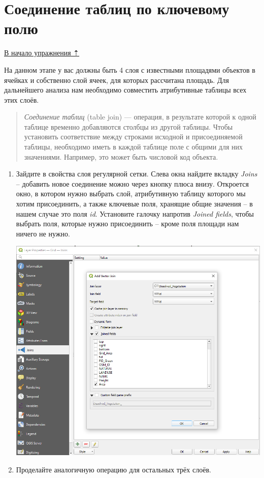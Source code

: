 \documentclass[
  12pt,
]{book}
\begin{document}
\hypertarget{spatrelations-join}{%
\section{Соединение таблиц по ключевому полю}\label{spatrelations-join}}

\protect\hyperlink{spatrelations}{В начало упражнения ⇡}

На данном этапе у вас должны быть 4 слоя с известными площадями объектов в ячейках и собственно слой ячеек, для которых рассчитана площадь. Для дальнейшего анализа нам необходимо совместить атрибутивные таблицы всех этих слоёв.

\begin{quote}
\emph{Соединение таблиц} (table join) --- операция, в результате которой к одной таблице временно добавляются столбцы из другой таблицы. Чтобы установить соответствие между строками исходной и присоединяемой таблицы, необходимо иметь в каждой таблице поле с общими для них значениями. Например, это может быть числовой код объекта.
\end{quote}

\begin{enumerate}
\def\labelenumi{\arabic{enumi}.}
\item
  Зайдите в свойства слоя регулярной сетки. Слева окна найдите вкладку \emph{Joins} -- добавить новое соединение можно через кнопку плюса внизу. Откроется окно, в котором нужно выбрать слой, атрибутивную таблицу которого мы хотим присоединить, а также ключевые поля, хранящие общие значения -- в нашем случае это поля \emph{id}. Установите галочку напротив \emph{Joined fields}, чтобы выбрать поля, которые нужно присоединить -- кроме поля площади нам ничего не нужно.

  \includegraphics{images/Ex06_SpatRelations/Add_Vector_Join.png}
\item
  Проделайте аналогичную операцию для остальных трёх слоёв.
\end{enumerate}
\end{document}
